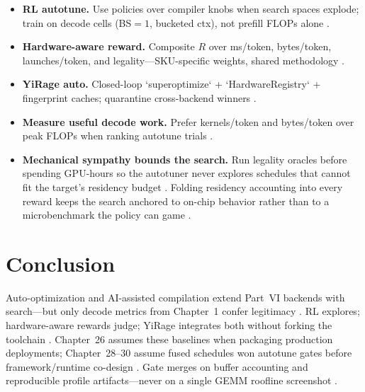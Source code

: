 \begin{itemize}
\item \textbf{RL autotune.} Use policies over compiler knobs when search spaces explode; train on decode cells (BS${=}1$, bucketed ctx), not prefill FLOPs alone \citep{taxbreak2026,memoryfloor2026,chen2020compilerbasedhardw}.
\item \textbf{Hardware-aware reward.} Composite $R$ over ms/token, bytes/token, launches/token, and legality---SKU-specific weights, shared methodology \citep{patel2025llminference,semianalysis2024tma,amd2024xdna}.
\item \textbf{YiRage auto.} Closed-loop `superoptimize` + `HardwareRegistry` + fingerprint caches; quarantine cross-backend winners \citep{yirage2026,kwon2023vllm,liu2024deepseekv3}.
\item \textbf{Measure useful decode work.} Prefer kernels/token and bytes/token over peak FLOPs when ranking autotune trials \citep{patel2025llminference,dlbook,memoryfloor2026}.
\item \textbf{Mechanical sympathy bounds the search.} Run legality oracles before spending GPU-hours so the autotuner never explores schedules that cannot fit the target's residency budget \citep{dao2022flashattention,chen2020compilerbasedhardw}. Folding residency accounting into every reward keeps the search anchored to on-chip behavior rather than to a microbenchmark the policy can game \citep{amd2024aie,memoryfloor2026}.
\end{itemize}

\section{Conclusion}
\label{sec:ch25_conclusion}

Auto-optimization and AI-assisted compilation extend Part~VI backends with search---but only decode metrics from Chapter~1 confer legitimacy \citep{taxbreak2026,memoryfloor2026,patel2025llminference}. RL explores; hardware-aware rewards judge; YiRage integrates both without forking the toolchain \citep{yirage2026,chen2020compilerbasedhardw}. Chapter~26 assumes these baselines when packaging production deployments; Chapter~28--30 assume fused schedules won autotune gates before framework/runtime co-design \citep{kwon2023vllm,yirage2026,amd2024aie}. Gate merges on buffer accounting and reproducible profile artifacts---never on a single GEMM roofline screenshot \citep{semianalysis2024tma,dlbook,liu2024deepseekv3}.

